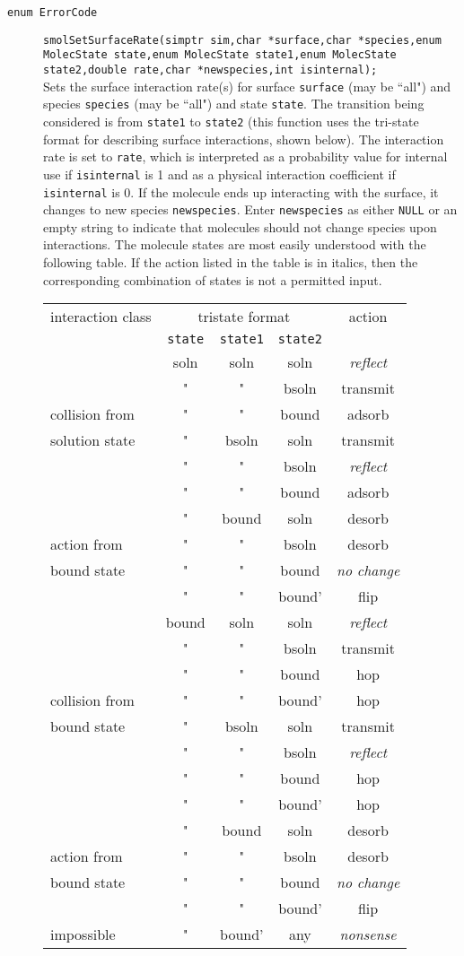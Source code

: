 \documentclass {book}
\begin{document}
\begin{description}
\item[\texttt{enum ErrorCode}]
\texttt{smolSetSurfaceRate(simptr sim,char *surface,char *species,enum MolecState state,enum MolecState state1,enum MolecState state2,double rate,char *newspecies,int isinternal);}
\hfill \\
Sets the surface interaction rate(s) for surface \texttt{surface} (may be ``all") and species \texttt{species} (may be ``all") and state \texttt{state}.  The transition being considered is from \texttt{state1} to \texttt{state2} (this function uses the tri-state format for describing surface interactions, shown below).  The interaction rate is set to \texttt{rate}, which is interpreted as a probability value for internal use if \texttt{isinternal} is 1 and as a physical interaction coefficient if \texttt{isinternal} is 0.  If the molecule ends up interacting with the surface, it changes to new species \texttt{newspecies}.  Enter \texttt{newspecies} as either \texttt{NULL} or an empty string to indicate that molecules should not change species upon interactions.  The molecule states are most easily understood with the following table.  If the action listed in the table is in italics, then the corresponding combination of states is not a permitted input.

\begin{longtable}[c]{l|ccc|c}
interaction class&\multicolumn{3}{c}{tristate format}&action\\
&\texttt{state}&\texttt{state1}&\texttt{state2}&\\
\hline
&soln&soln&soln&\emph{reflect}\\
&"&"&bsoln&transmit\\
collision from&"&"&bound&adsorb\\
solution state&"&bsoln&soln&transmit\\
&"&"&bsoln&\emph{reflect}\\
&"&"&bound&adsorb\\
\hline
&"&bound&soln&desorb\\
action from&"&"&bsoln&desorb\\
bound state&"&"&bound&\emph{no change}\\
&"&"&bound'&flip\\
\hline
&bound&soln&soln&\emph{reflect}\\
&"&"&bsoln&transmit\\
&"&"&bound&hop\\
collision from&"&"&bound'&hop\\
bound state&"&bsoln&soln&transmit\\
&"&"&bsoln&\emph{reflect}\\
&"&"&bound&hop\\
&"&"&bound'&hop\\
\hline
&"&bound&soln&desorb\\
action from&"&"&bsoln&desorb\\
bound state&"&"&bound&\emph{no change}\\
&"&"&bound'&flip\\
\hline
impossible&"&bound'&any&\emph{nonsense}\\
\end{longtable}


\end{description}
\end{document}
